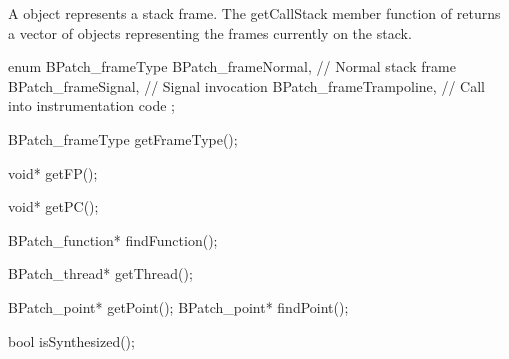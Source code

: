 
A  object represents a stack frame. The
getCallStack member function of  returns a vector of
 objects representing the frames currently on the stack.

\begin{apient}
  enum BPatch_frameType {
    BPatch_frameNormal,     // Normal stack frame
    BPatch_frameSignal,     // Signal invocation
    BPatch_frameTrampoline, // Call into instrumentation code
  };
\end{apient}

\begin{apient}
  BPatch_frameType getFrameType();
\end{apient}


\begin{apient}
  void* getFP();
\end{apient}

\begin{apient}
  void* getPC();
\end{apient}

\begin{apient}
  BPatch_function* findFunction();
\end{apient}

\begin{apient}
  BPatch_thread* getThread();
\end{apient}

\begin{apient}
  BPatch_point* getPoint();
  BPatch_point* findPoint();
\end{apient}


\begin{apient}
  bool isSynthesized();
\end{apient}

